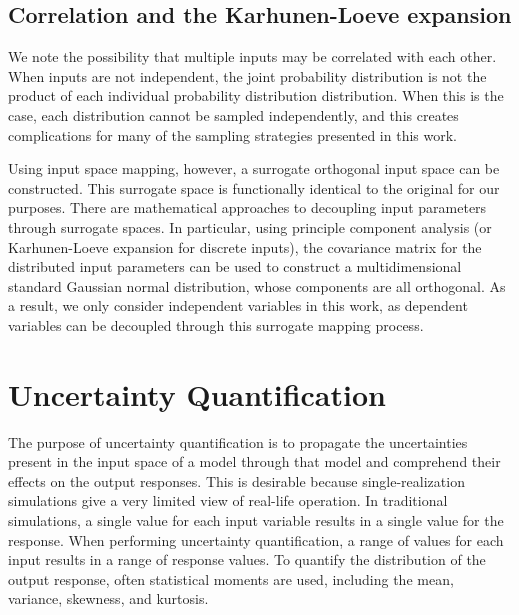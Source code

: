 \subsection{Correlation and the Karhunen-Loeve expansion}\label{sec:KL}
We note the possibility that multiple inputs may be correlated with each other.  When inputs are not
independent, the joint probability distribution is not the product of each individual probability distribution
distribution.  When this is the case, each distribution cannot be sampled independently, and this
creates complications for many of the sampling strategies presented in this work.  

Using input space mapping, however, a surrogate orthogonal input space can be
constructed.  This surrogate space is functionally identical to the original for our purposes.
There are mathematical approaches to decoupling input parameters through surrogate
spaces.  In particular, using principle component analysis (or Karhunen-Loeve expansion
\cite{karhunen} for discrete inputs), the covariance matrix for the distributed input parameters
can be used to construct a multidimensional
standard Gaussian normal distribution, whose components are all orthogonal.
As a result, we only consider independent variables in this work, as dependent variables can
be decoupled through this surrogate mapping process.


\section{Uncertainty Quantification}
The purpose of uncertainty quantification is to propagate the uncertainties present in the input space of a
model through that model and comprehend their effects on the output responses.  This is desirable because
single-realization simulations give a very limited view of real-life operation.  In traditional simulations, a
single value for each input variable results in a single value for the response.  When performing uncertainty
quantification, a range of values for each input results in a range of response values.  To quantify the
distribution of the output response, often statistical moments are used, including the mean, variance,
skewness, and kurtosis.

